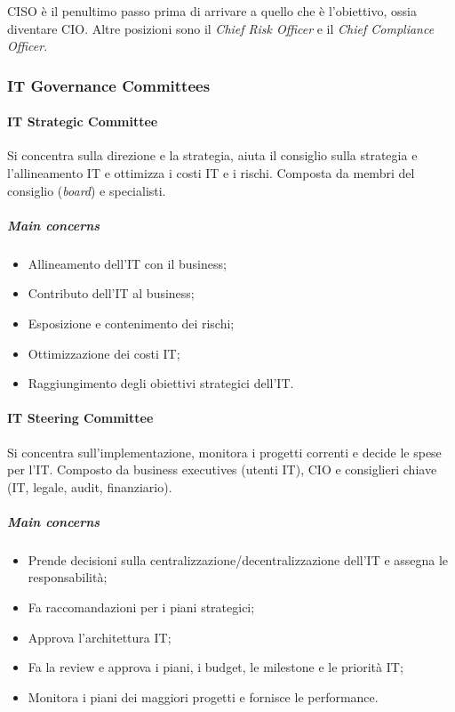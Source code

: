 CISO è il penultimo passo prima di arrivare a quello che è l'obiettivo, ossia
diventare CIO. Altre posizioni sono il \textit{Chief Risk Officer} e il
\textit{Chief Compliance Officer}.

\subsubsection{IT Governance Committees}

\paragraph{IT Strategic Committee}

Si concentra sulla direzione e la strategia, aiuta il consiglio sulla strategia
e l'allineamento IT e ottimizza i costi IT e i rischi. Composta da membri del
consiglio (\textit{board}) e specialisti.

\subparagraph*{Main concerns}

\begin{itemize}
\item Allineamento dell'IT con il business;
\item Contributo dell'IT al business;
\item Esposizione e contenimento dei rischi;
\item Ottimizzazione dei costi IT;
\item Raggiungimento degli obiettivi strategici dell'IT.
\end{itemize}

\paragraph{IT Steering Committee}

Si concentra sull'implementazione, monitora i progetti correnti e decide le
spese per l'IT. Composto da business executives (utenti IT), CIO e consiglieri
chiave (IT, legale, audit, finanziario).

\subparagraph*{Main concerns}

\begin{itemize}
\item Prende decisioni sulla centralizzazione/decentralizzazione dell'IT e
assegna le responsabilità;
\item Fa raccomandazioni per i piani strategici;
\item Approva l'architettura IT;
\item Fa la review e approva i piani, i budget, le milestone e le priorità IT;
\item Monitora i piani dei maggiori progetti e fornisce le performance.
\end{itemize}

